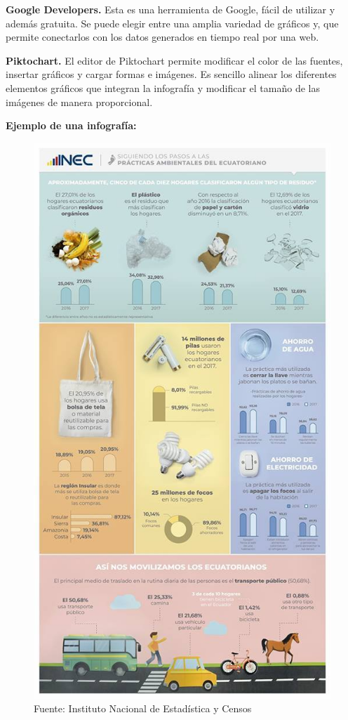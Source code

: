 \documentclass[a5paper,doc,10pt,noapacite]{apa6}
\begin{document}
{{\textbf{Google Developers.}
Esta es una herramienta de Google, fácil de utilizar y además gratuita. Se puede elegir entre una amplia variedad de gráficos y, que permite conectarlos con los datos generados en tiempo real por una web.

\textbf{Piktochart.}
El editor de Piktochart permite modificar el color de las fuentes, insertar gráficos y cargar formas e imágenes. Es sencillo alinear los diferentes elementos gráficos que integran la infografía y modificar el tamaño de las imágenes de manera proporcional.

\vspace{1\baselineskip}
\textbf{Ejemplo de una infografía:}

\begin{figure}[H]
\fontsize{7}{11}\selectfont
\captionsetup{justification=centering, labelfont=footnotesize, font=footnotesize}
\centering
\includegraphics[scale=0.39]{Graficos/fig4_GC.jpg}
\caption*{Fuente: Instituto Nacional de Estadística y Censos}
\end{figure}


}}
\end{document}
